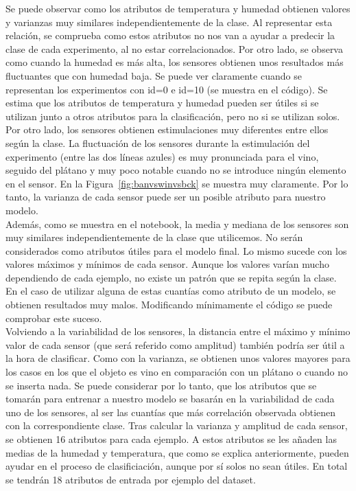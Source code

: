\documentclass{esannV2}
\begin{document}
Se puede observar como los atributos de temperatura y humedad obtienen valores  y varianzas muy similares independientemente de la clase. Al representar esta relación, se comprueba como estos atributos no nos van a ayudar a predecir la clase de cada experimento, al no estar correlacionados. Por otro lado, se observa como cuando la humedad es más alta, los sensores obtienen unos resultados más fluctuantes que con humedad baja. Se puede ver claramente cuando se representan los experimentos con id=0 e id=10 (se muestra en el código). Se estima que los atributos de temperatura y humedad pueden ser útiles si se utilizan junto a otros atributos para la clasificación, pero no si se utilizan solos. \\

Por otro lado, los sensores obtienen estimulaciones muy diferentes entre ellos según la clase. La fluctuación de los sensores durante la estimulación del experimento (entre las dos líneas azules)  es muy pronunciada para el vino, seguido del plátano y muy poco notable cuando no se introduce ningún elemento en el sensor. En la Figura~\ref{fig:banvswinvsbck} se muestra muy claramente. Por lo tanto, la varianza de cada sensor puede ser un posible atributo para nuestro modelo. \\

Además, como se muestra en el notebook, la media y mediana de los sensores son muy similares independientemente de la clase que utilicemos. No serán considerados como atributos útiles para el modelo final. Lo mismo sucede con los valores máximos y mínimos de cada sensor. Aunque los valores varían mucho dependiendo de cada ejemplo, no existe un patrón que se repita según la clase. En el caso de utilizar alguna de estas cuantías como atributo de un modelo, se obtienen resultados muy malos. Modificando mínimamente el código se puede comprobar este suceso. \\

Volviendo a la variabilidad de los sensores, la distancia entre el máximo y mínimo valor de cada sensor (que será referido como amplitud) también podría ser útil a la hora de clasificar. Como con la varianza, se obtienen unos valores mayores para los casos en los que el objeto es vino en comparación con un plátano o cuando no se inserta nada.  Se puede considerar por lo tanto, que los atributos que se tomarán para entrenar a nuestro modelo se basarán en la variabilidad de cada uno de los sensores, al ser las cuantías que más correlación observada obtienen con la correspondiente clase. Tras calcular  la varianza y amplitud de cada sensor, se obtienen 16 atributos para cada ejemplo. A estos atributos se les añaden las medias de la humedad y temperatura, que como se explica anteriormente, pueden ayudar en el proceso de clasificiación, aunque por sí solos no sean útiles. En total se tendrán 18 atributos de entrada por ejemplo del dataset.\\
\end{document}
